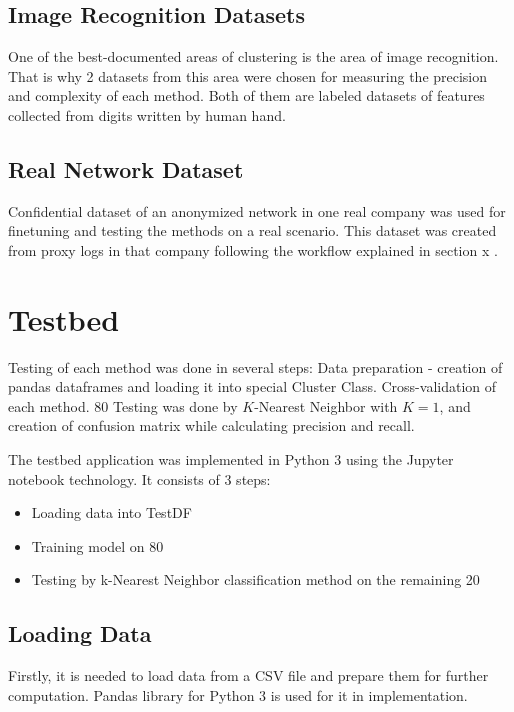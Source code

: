 \documentclass[thesis=B,english]{FITthesis}[2012/10/20]
\begin{document}
\subsection{Image Recognition Datasets}
One of the best-documented areas of clustering is the area of image recognition.
That is why 2 datasets from this area were chosen for measuring the precision and complexity of each method. Both of them are labeled datasets of features collected from digits written by human hand. \\


\subsection{Real Network Dataset}
Confidential dataset of an anonymized network in one real company was used for finetuning and testing the methods on a real scenario.
This dataset was created from proxy logs in that company following the workflow explained in section x . \\

\section{Testbed}
Testing of each method was done in several steps:
Data preparation - creation of pandas dataframes and loading it into special Cluster Class.
Cross-validation of each method. 80%
Testing was done by $K$-Nearest Neighbor with $K = 1$, and creation of confusion matrix while calculating precision and recall.

The testbed application was implemented in Python 3 using the Jupyter notebook technology.
It consists of 3 steps:
\begin{itemize}
    \item Loading data into TestDF
    \item Training model on 80%
    \item Testing by k-Nearest Neighbor classification method on the remaining 20%
\end{itemize}

\subsection{Loading Data}
Firstly, it is needed to load data from a CSV file and prepare them for further computation.
Pandas library for Python 3 is used for it in implementation.
\end{document}
